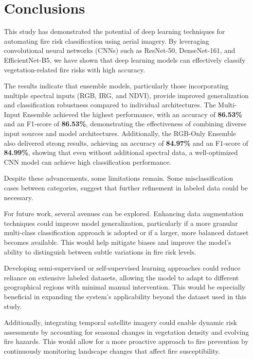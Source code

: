 %

\chapter{Conclusions}
\label{cha:conclusions}

This study has demonstrated the potential of deep learning techniques for automating 
fire risk classification using aerial imagery. By leveraging convolutional neural 
networks (CNNs) such as ResNet-50, DenseNet-161, and EfficientNet-B5, we have shown 
that deep learning models can effectively classify vegetation-related fire risks with 
high accuracy.

The results indicate that ensemble models, particularly those incorporating multiple 
spectral inputs (RGB, IRG, and NDVI), provide improved generalization and classification 
robustness compared to individual architectures. The Multi-Input Ensemble achieved the 
highest performance, with an accuracy of \textbf{86.53\%} and an F1-score of \textbf{86.53\%}, 
demonstrating the effectiveness of combining diverse input sources and model architectures. 
Additionally, the RGB-Only Ensemble also delivered strong results, achieving an accuracy of \textbf{84.97\%}
and an F1-score of \textbf{84.99\%}, showing that even without additional spectral data, 
a well-optimized CNN model can achieve high classification performance.

Despite these advancements, some limitations remain. Some misclassification cases between
categories, suggest that further refinement in labeled data could be necessary.

For future work, several avenues can be explored. Enhancing data augmentation techniques 
could improve model generalization, particularly if a more granular multi-class classification 
approach is adopted or if a larger, more balanced dataset becomes available. This would help 
mitigate biases and improve the model's ability to distinguish between subtle variations in 
fire risk levels.

Developing semi-supervised or self-supervised learning approaches could reduce reliance on 
extensive labeled datasets, allowing the model to adapt to different geographical regions 
with minimal manual intervention. This would be especially beneficial in expanding the 
system's applicability beyond the dataset used in this study.

Additionally, integrating temporal satellite imagery could enable dynamic risk assessments 
by accounting for seasonal changes in vegetation density and evolving fire hazards. This 
would allow for a more proactive approach to fire prevention by continuously monitoring 
landscape changes that affect fire susceptibility.

